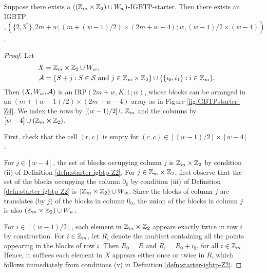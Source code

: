 \documentclass[draft, 11pt]{article}
\begin{document}
 \begin{proposition}\label{prop:starter-igbtp-Z2}
 Suppose there exists a $((\mathbb Z_m\times \mathbb Z_2)\cup W_w)$-IGBTP-starter.%
 Then there exists
 an IGBTP$_1(\{2,3^*\},2m+w,(m+(w-1)/2)\times (2m+w-4);w,(w-1)/2\times (w-4) )$.
 \end{proposition}

\begin{proof}
Let
\begin{align*}
X &= \mathbb Z_{m}\times\mathbb Z_2\cup W_w, \\
\mathcal A &= \{S+j:\text{$S\in \mathcal S$ and $j\in\mathbb Z_{m}\times\mathbb Z_2$}\}\cup\{\{i_0,i_1\}: i\in\mathbb Z_m\}.
\end{align*}
Then $(X,W_w,\mathcal A)$ is an IRP$(2m+w,K,1;w)$, whose blocks can be arranged in an
$(m+(w-1)/2)\times (2m+w-4)$ array as in Figure \ref{fig:GBTPstarter-Z4}.
We index the rows by $[(w-1)/2]\cup \mathbb Z_m$ and the columns by $[w-4]\cup(\mathbb Z_m\times \mathbb Z_2)$.

First, check that the cell $(r,c)$ is empty for $(r,c)\in [(w-1)/2]\times [w-4]$.

For $j\in[w-4]$, the set of blocks occupying column $j$ is $\mathbb Z_m\times\mathbb Z_2$
by condition (ii) of Definition \ref{defn:starter-igbtp-Z2}.
For $j\in \mathbb Z_m\times \mathbb Z_2$, first observe that 
the set of the blocks occupying the column $0_0$ by condition (iii) of Definition \ref{defn:starter-igbtp-Z2} 
is $(\mathbb Z_m\times \mathbb Z_2)\cup W_w$. 
Since the blocks of column $j$ are translates (by $j$) of the blocks in column $0_0$, 
the union of the blocks in column $j$ is also $(\mathbb Z_m\times \mathbb Z_2)\cup W_w$.

For $i\in[(w-1)/2]$, each element in $\mathbb Z_m\times \mathbb Z_2$ appears exactly twice in row $i$ by construction.
For $i\in\mathbb Z_m$, let $R_{i}$ denote the multiset containing all the points
appearing in the blocks of row $i$. Then $R_0=R$ and $R_{i} = R_{0}+i_0$,
for all $i\in\mathbb Z_{m}$. Hence, it suffices each element in $X$ appears either once or twice in $R$,
which follows immediately from conditions (v) in Definition \ref{defn:starter-igbtp-Z2}.
\end{proof}
\end{document}

